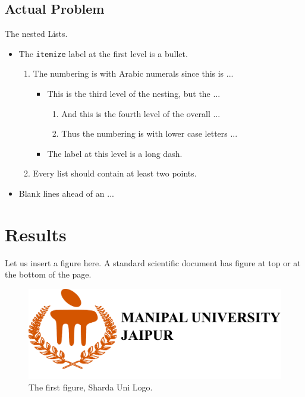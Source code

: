 \documentclass[11pt, a4paper]{article}
\begin{document}
\subsection{Actual Problem}\label{ActProb}
The nested Lists.
\renewcommand\labelitemi{$\square$}
\renewcommand{\labelitemii}{$\diamond$}
\begin{itemize}
\item The {\tt itemize} label at the first level is a bullet.
\begin{enumerate}
\item The numbering is with Arabic numerals since this is ...
\begin{itemize}
\item This is the third level of the nesting, but the ...
\begin{enumerate}
\item And this is the fourth level of the overall ...
\item Thus the numbering is with lower case letters ...
\end{enumerate}
\item The label at this level is a long dash.
\end{itemize}
\item Every list should contain at least two points.
\end{enumerate}
\item Blank lines ahead of an ...
\end{itemize}

\section{Results}\label{res}

Let us insert a figure here. A standard scientific document has figure at top or at the bottom of the page.

\begin{figure}[t]
\includegraphics[scale=0.4, angle=123.7]{fig/logo} %
\caption{The first figure, Sharda Uni Logo.}
\end{figure}
\end{document}
